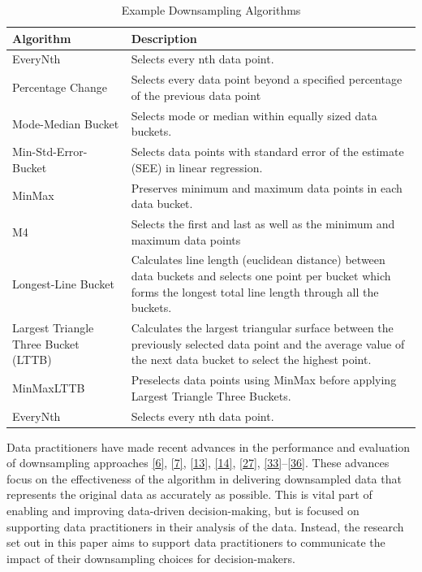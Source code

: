 \documentclass{article}
\begin{document}
\renewcommand{\arraystretch}{1.5}

\begin{table}[H]

\caption{\label{tab:unnamed-chunk-1}Example Downsampling Algorithms}
\centering
\begin{tabular}[t]{>{\raggedright\arraybackslash}p{1.8in}|>{\raggedright\arraybackslash}p{3.8in}}
\hline
Algorithm & Description\\
\hline
EveryNth & Selects every nth data \vphantom{1} point.\\
\hline
Percentage Change & Selects every data point beyond a specified percentage of the previous data point\\
\hline
Mode-Median Bucket & Selects mode or median within equally sized data buckets.\\
\hline
Min-Std-Error-Bucket & Selects data points with standard error of the estimate (SEE) in linear regression.\\
\hline
MinMax & Preserves minimum and maximum data points in each data bucket.\\
\hline
M4 & Selects the first and last as well as the minimum and maximum data points\\
\hline
Longest-Line Bucket & Calculates line length (euclidean distance) between data buckets and selects one point per bucket which forms the longest total
line length through all the buckets.\\
\hline
Largest Triangle Three Bucket (LTTB) & Calculates the largest triangular surface between the previously selected data point and the average value of the next data bucket to select the highest point.\\
\hline
MinMaxLTTB & Preselects data points using MinMax before applying Largest Triangle Three Buckets.\\
\hline
EveryNth & Selects every nth data point.\\
\hline
\end{tabular}
\end{table}

Data practitioners have made recent advances in the performance and
evaluation of downsampling approaches
\protect\hyperlink{ref-datapoint}{{[}6{]}},
\protect\hyperlink{ref-MinMaxLTTB}{{[}7{]}},
\protect\hyperlink{ref-downsampling}{{[}13{]}},
\protect\hyperlink{ref-sampling}{{[}14{]}},
\protect\hyperlink{ref-plotly}{{[}27{]}},
\protect\hyperlink{ref-dashql}{{[}33{]}}--\protect\hyperlink{ref-MinMaxOrdered}{{[}36{]}}.
These advances focus on the effectiveness of the algorithm in delivering
downsampled data that represents the original data as accurately as
possible. This is vital part of enabling and improving data-driven
decision-making, but is focused on supporting data practitioners in
their analysis of the data. Instead, the research set out in this paper
aims to support data practitioners to communicate the impact of their
downsampling choices for decision-makers.
\end{document}
